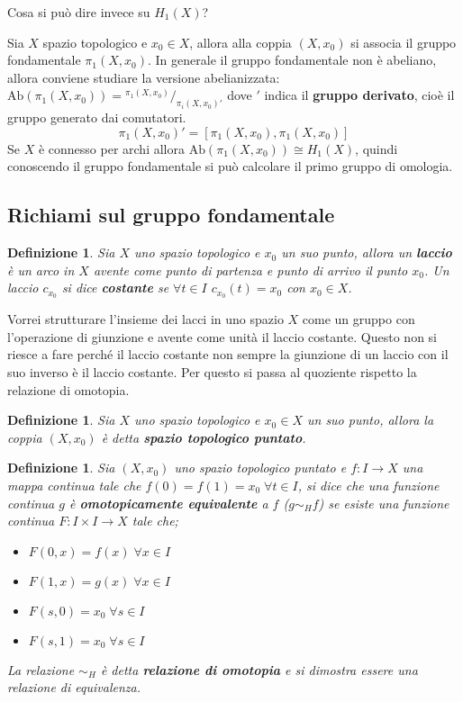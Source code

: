 \documentclass[10pt, twoside=false, x11names]{scrbook}
\newtheorem{definition}[theorem]{Definizione}
\newcommand{\Ab}[1]{\mathrm{Ab}( #1 )}
\newcommand{\vedi}[1]{\emph{vedi} #1}
\newcommand*\quot[2]{{^{\textstyle #1}\big/_{\textstyle #2}}}
\begin{document}
Cosa si può dire invece su $ H_1(X) $?

Sia $ X $ spazio topologico e $ x_0 \in X $, allora alla coppia $ (X, x_0) $ si associa il gruppo fondamentale
$ \pi_1(X,x_0) $. In generale il gruppo fondamentale non è abeliano, allora conviene studiare la versione abelianizzata:
$ \Ab{\pi_1(X,x_0)} = \quot{\pi_1(X,x_0)}{\pi_i(X,x_0)'} $ dove $ ' $ indica il \textbf{gruppo derivato},  cioè il gruppo
generato dai comutatori.
\[
  \pi_1(X,x_0)' = [\pi_1(X,x_0), \pi_1(X,x_0)]
\]
Se $ X $ è connesso per archi allora $ \Ab{\pi_1(X,x_0)} \cong H_1(X) $, quindi conoscendo il gruppo fondamentale si può calcolare il
primo gruppo di omologia.


\subsection{Richiami sul gruppo fondamentale}

\begin{definition}
  Sia $ X $ uno spazio topologico e $ x_0 $ un suo punto, allora un \textbf{laccio} è un arco in $ X $
  avente come punto di partenza e punto di arrivo il punto $ x_0 $. Un laccio $ c_{x_0} $ si dice \textbf{costante} se $ \forall t \in I $
  $ c_{x_0}(t) = x_0 $ con $ x_0 \in X $.
\end{definition}

Vorrei strutturare l'insieme dei lacci in uno spazio $ X $ come un gruppo con l'operazione di giunzione
e avente come unità il laccio costante. Questo non si riesce a fare perché il laccio costante non sempre
la giunzione di un laccio con il suo inverso è il laccio costante. Per questo si passa al quoziente
rispetto la relazione di omotopia.

\begin{definition}
  Sia $ X $ uno spazio topologico e $ x_0 \in X $ un suo punto, allora la coppia $ (X, x_0) $ è detta \textbf{spazio topologico puntato}.
\end{definition}

\begin{definition}
  Sia $ (X, x_0) $ uno spazio topologico puntato e $ f: I \to X $ una mappa continua tale che $ f(0) = f(1) = x_0 \; \forall t \in I $,
  si dice che una funzione continua $ g $ è \textbf{omotopicamente equivalente} a $ f $ ($ g \sim_H f $) se esiste una funzione
  continua $ F: I \times I \to X $ tale che;
  \begin{itemize}
  \item $ F(0,x) = f(x) \; \forall x \in I $
  \item $ F(1,x) = g(x) \; \forall x \in I$
  \item $ F(s,0) = x_0 \; \forall s \in I $
  \item $ F(s,1) = x_0 \; \forall s \in I $
  \end{itemize}
  La relazione $ \sim_H $ è detta \textbf{relazione di omotopia}  \index{Omotopia! \vedi{Relazione di omotopia}}
  e si dimostra essere una relazione di equivalenza.
\end{definition}
\end{document}
